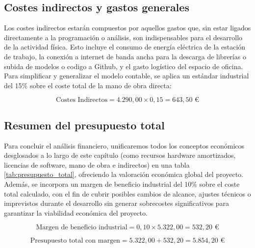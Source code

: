 \documentclass[12pt,a4paper,onecolumn,oneside]{report}
\begin{document}
\subsection{Costes indirectos y gastos generales}

Los costes indirectos estarán compuestos por aquellos gastos que, sin estar ligados directamente a la programación o análisis, son indispensables para el desarrollo de la actividad física. Esto incluye el consumo de energía eléctrica de la estación de trabajo, la conexión a internet de banda ancha para la descarga de librerías o subida de modelos o codigo a Github, y el gasto logístico del espacio de oficina. Para simplificar y generalizar el modelo contable, se aplica un estándar industrial del 15\% sobre el coste total de la mano de obra directa:

\begin{equation}
\text{Costes Indirectos} = 4.290,00 \times 0,15 = 643,50 \text{ €}
\end{equation}

\subsection{Resumen del presupuesto total}

Para concluir el análisis financiero, unificaremos todos los conceptos económicos desglosados a lo largo de este capítulo (como recursos hardware amortizados, licencias de software, mano de obra e indirectos) en una tabla \ref{tab:presupuesto_total}, ofreciendo la valoración económica global del proyecto. Además, se incorpora un margen de beneficio industrial del 10\% sobre el coste total calculado, con el fin de cubrir posibles cambios de alcance, ajustes técnicos o imprevistos durante el desarrollo sin generar sobrecostes significativos para garantizar la viabilidad económica del proyecto.

\begin{equation}
\text{Margen de beneficio industrial} = 0{,}10 \times 5.322,00 = 532,20 \text{ €}
\end{equation}

\begin{equation}
\text{Presupuesto total con margen} = 5.322,00 + 532,20 = 5.854,20 \text{ €}
\end{equation}
\end{document}

